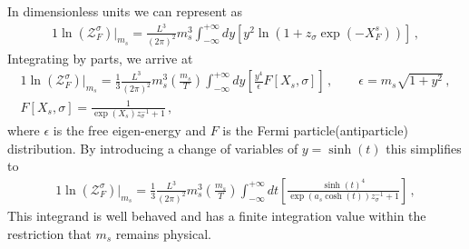 In dimensionless units we can represent  as
\begin{alignat}{1}
    \label{FreelikeAlt} \ln\left(\mathcal{Z}^{\sigma}_{F}\right)|_{m_{s}}=\frac{L^{3}}{(2\pi)^{2}}m_{s}^{3}\int^{+\infty}_{-\infty}dy\left[y^{2}\ln\left(1+z_{\sigma}\exp(-X^{s}_{F})\right)\right]\,,
\end{alignat}
Integrating by parts, we arrive at
\begin{alignat}{1}
    \label{FreelikeParts} \ln\left(\mathcal{Z}^{\sigma}_{F}\right)|_{m_{s}}=\frac{1}{3}\frac{L^{3}}{(2\pi)^{2}}m_{s}^{3}\left(\frac{m_{s}}{T}\right)\int^{+\infty}_{-\infty}dy\left[\frac{y^{4}}{\epsilon}F[X_{s},\sigma]\right]\,,\qquad \epsilon=m_{s}\sqrt{1+y^{2}}\,,\\
    \label{FermD} F[X_{s},\sigma] = \frac{1}{\exp(X_{s})z_{\sigma}^{-1}+1}\,,
\end{alignat}
where $\epsilon$ is the free eigen-energy and $F$ is the Fermi particle(antiparticle) distribution. By introducing a change of variables of $y=\sinh(t)$ this simplifies to
\begin{alignat}{1}
    \label{FreelikeFinal} \ln\left(\mathcal{Z}^{\sigma}_{F}\right)|_{m_{s}}=\frac{1}{3}\frac{L^{3}}{(2\pi)^{2}}m_{s}^{3}\left(\frac{m_{s}}{T}\right)\int^{+\infty}_{-\infty}dt\left[\frac{\sinh(t)^{4}}{\exp(a_{s}\cosh(t))z_{\sigma}^{-1}+1}\right]\,,
\end{alignat}
This integrand is well behaved and has a finite integration value within the restriction that $m_{s}$ remains physical.

